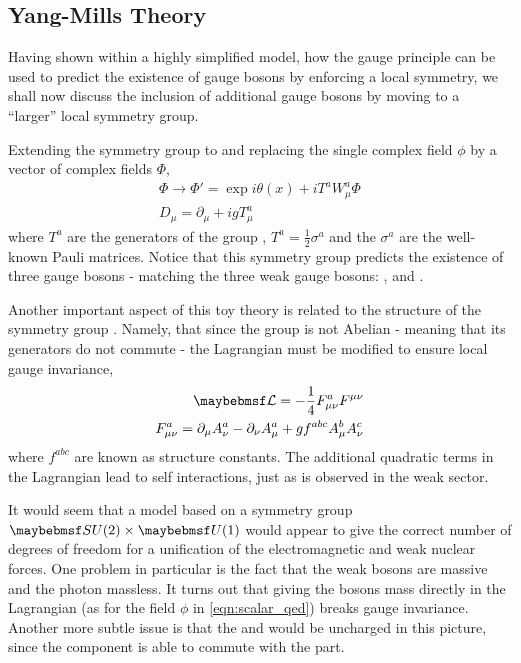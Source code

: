 \subsection{Yang-Mills Theory}
Having shown within a highly simplified model, how the gauge principle can be
used to predict the existence of gauge bosons by enforcing a local symmetry, we
shall now discuss the inclusion of additional gauge bosons by moving to a
``larger'' local symmetry group.

Extending the symmetry group to \SUtwo and replacing the single complex field
$\phi$ by a vector of complex fields $\Phi$,
\begin{eqnarray*}
\Phi \longrightarrow \Phi' = \exp{i\theta(x) + iT^a W^a_{\mu}}\Phi\\
D_{\mu} = \partial_{\mu} + igT^a_{\mu}
\end{eqnarray*}
where $T^a$ are the generators of the group \SUtwo, $T^a = \frac{1}{2}\sigma^a$
and the $\sigma^a$ are the well-known Pauli matrices. Notice that this symmetry
group predicts the existence of three gauge bosons - matching the three weak
gauge bosons: \PZ, \PWp and \PWm.

Another important aspect of this toy theory is related to the structure of the
symmetry group \SUtwo. Namely, that since the group is not Abelian - meaning
that its generators do not commute - the Lagrangian must be modified to ensure
local gauge invariance,
\begin{eqnarray*}
\lagrangiand = -\frac{1}{4}F^a_{\mu\nu}F^{\mu\nu} \\
F^a_{\mu\nu} = \partial_{\mu} A^a_{\nu} - \partial_{\nu} A^a_{\mu} + g f^{abc}
A^b_{\mu} A^c_{\nu}
\end{eqnarray*}
where $f^{abc}$ are known as structure constants. The additional quadratic terms
in the Lagrangian lead to self interactions, just as is observed in the weak
sector.

It would seem that a model based on a symmetry group $\SUtwo\times\Uone$ would
appear to give the correct number of degrees of freedom for a unification of the
electromagnetic and weak nuclear forces. One problem in particular is the fact
that the weak bosons are massive and the photon massless. It turns out that
giving the bosons mass directly in the Lagrangian (as for the field $\phi$
in \ref{eqn:scalar_qed}) breaks gauge invariance. Another more subtle issue is
that the \PWp and \PWm would be uncharged in this picture, since the \SUtwo
component is able to commute with the \Uone part.

